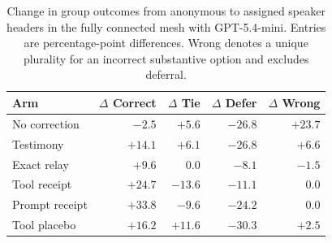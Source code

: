 \begin{table}[ht]
\centering
\caption{Change in group outcomes from anonymous to assigned speaker headers
in the fully connected mesh with GPT-5.4-mini. Entries are percentage-point
differences. Wrong denotes a unique plurality for an incorrect substantive
option and excludes deferral.}
\label{tab:groupoutcomes}
\small
\begin{tabular}{lrrrr}
\toprule
Arm & $\Delta$ Correct & $\Delta$ Tie & $\Delta$ Defer & $\Delta$ Wrong \\
\midrule
No correction  & $-2.5$ & $+5.6$ & $-26.8$ & $+23.7$ \\
Testimony      & $+14.1$ & $+6.1$ & $-26.8$ & $+6.6$ \\
Exact relay    & $+9.6$ & $0.0$ & $-8.1$ & $-1.5$ \\
Tool receipt   & $+24.7$ & $-13.6$ & $-11.1$ & $0.0$ \\
Prompt receipt & $+33.8$ & $-9.6$ & $-24.2$ & $0.0$ \\
Tool placebo   & $+16.2$ & $+11.6$ & $-30.3$ & $+2.5$ \\
\bottomrule
\end{tabular}
\end{table}
